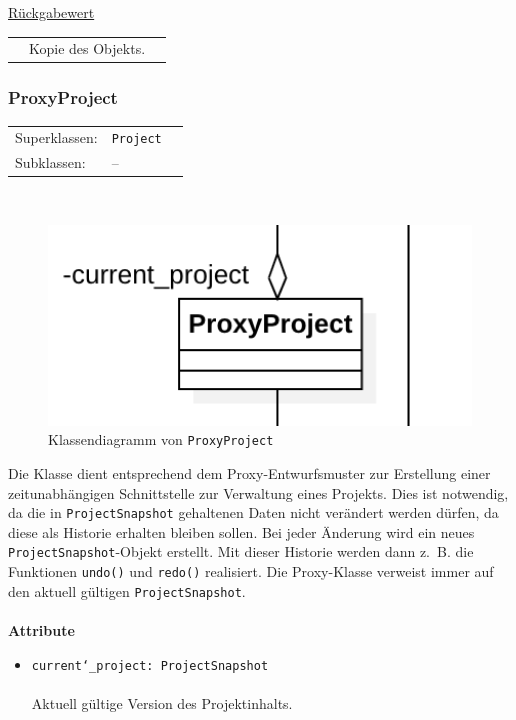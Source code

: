 \documentclass{article}
\begin{document}
\begin{itemize}
\begin{itemize}
\underline{Rückgabewert}\\
\begin{tabular}{lll}
 & Kopie des Objekts.\\
\end{tabular}
\end{itemize}

\newpage
\subsubsection*{\large{\textbf{ProxyProject}\label{cls:ProxyProject}}}\normalsize
\begin{tabular}{lll}
 Superklassen: & \texttt{Project}\\
 Subklassen: & --
\end{tabular}\\
\begin{figure}[H]%
    \centering
    \includegraphics[width=13cm]{entwurf/Entwurf_dokument/img/cls/model/ProxyProject.png}
    \caption{Klassendiagramm von \texttt{ProxyProject}}
\end{figure}

Die Klasse dient entsprechend dem Proxy-Entwurfsmuster zur Erstellung einer zeitunabhängigen Schnittstelle zur Verwaltung eines Projekts. Dies ist notwendig, da die in \texttt{ProjectSnapshot} gehaltenen Daten nicht verändert werden dürfen, da diese als Historie erhalten bleiben sollen. Bei jeder Änderung wird ein neues \texttt{ProjectSnapshot}-Objekt erstellt. Mit dieser Historie werden dann z.~B. die Funktionen \texttt{undo()} und \texttt{redo()} realisiert. Die Proxy-Klasse verweist immer auf den aktuell gültigen \texttt{ProjectSnapshot}.
\\\\

\textbf{Attribute}
\begin{itemize}\setlength\itemsep{3em}
\item \texttt{current\char`_project: ProjectSnapshot}\\\\
Aktuell gültige Version des Projektinhalts.
\\\\
\end{itemize}


\end{itemize}
\end{document}

